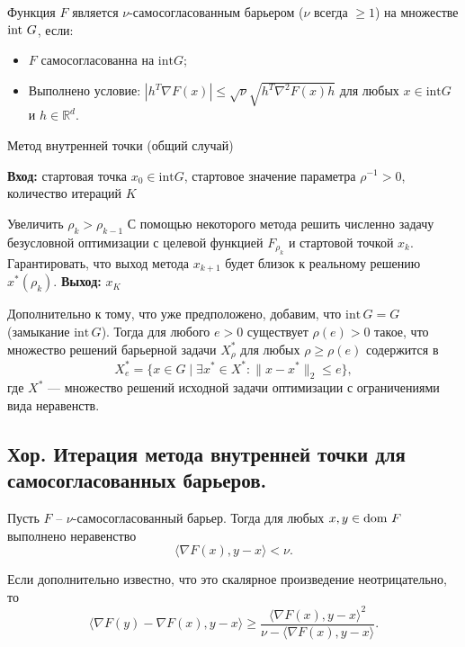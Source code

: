 \begin{definition}
    Функция $F$ является $\nu$-самосогласованным барьером ($\nu$ всегда $\geq 1$) на множестве $\operatorname{int \,} G$, если:
    \begin{itemize}
        \item $F$ самосогласованна на $\text{int}G$;
        \item Выполнено условие: $|h^T \nabla F(x)| \leq \sqrt{\nu} \sqrt{h^T \nabla^2 F(x) h}$ для любых $x \in \text{int}G$ и $h \in \mathbb{R}^d$.
    \end{itemize}
\end{definition}

\begin{algorithm}[H]
    \caption{Метод внутренней точки (общий случай)}
    \textbf{Вход:} стартовая точка $x_0 \in \text{int}G$, стартовое значение параметра $\rho^{-1} > 0$, количество итераций $K$
    \begin{algorithmic}[1]
        \State Увеличить $\rho_k > \rho_{k-1}$
        \State С помощью некоторого метода решить численно задачу безусловной оптимизации с целевой функцией $F_{\rho_k}$ и стартовой точкой $x_k$. Гарантировать, что выход метода $x_{k+1}$ будет близок к реальному решению $x^*(\rho_k)$.
        \EndFor
        \State \textbf{Выход:} $x_K$
    \end{algorithmic}
\end{algorithm}

\begin{theorem}
    Дополнительно к тому, что уже предположено, добавим, что $\mathrm{int}\,G = G$ (замыкание $\mathrm{int}\,G$). Тогда для любого $e > 0$ существует $\rho(e) > 0$ такое, что множество решений барьерной задачи $X^*_\rho$ для любых $\rho \geq \rho(e)$ содержится в
    $$X^*_e = \{x \in G \mid \exists x^* \in X^*: \|x - x^*\|_2 \leq e\},$$
    где $X^*$ — множество решений исходной задачи оптимизации с ограничениями вида неравенств.

\end{theorem}

\subsection{Хор. Итерация метода внутренней точки для самосогласованных барьеров.}

\begin{theorem}
    Пусть $F$ – $\nu$-самосогласованный барьер. Тогда для любых $x, y \in \operatorname{dom \,} F$ выполнено неравенство
    $$\langle \nabla F(x), y - x \rangle < \nu.$$

    Если дополнительно известно, что это скалярное произведение неотрицательно, то
    $$\langle \nabla F(y) - \nabla F(x), y - x \rangle \geq \frac{\langle \nabla F(x), y - x \rangle^2}{\nu - \langle \nabla F(x), y - x \rangle}.$$
\end{theorem}

